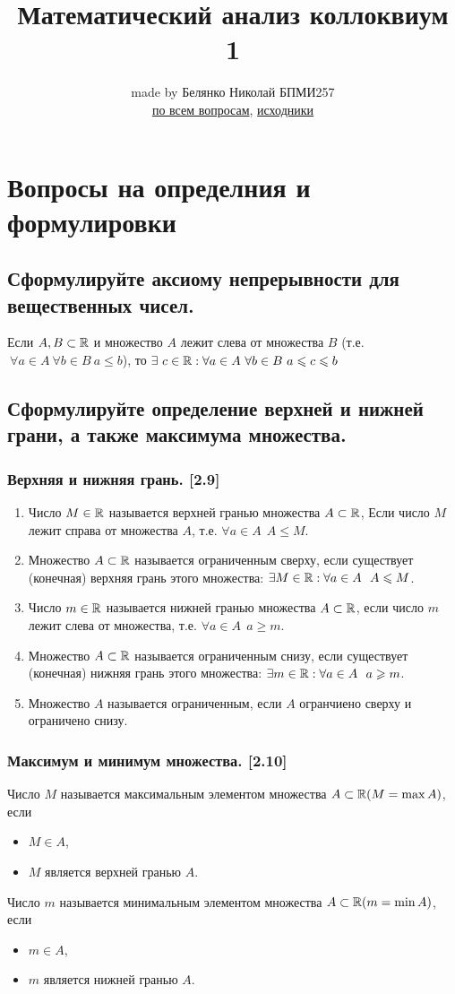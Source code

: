 \documentclass[12pt, a4paper]{article}
\author{made by Белянко Николай БПМИ257 \\
\href{https://t.me/nikbel26}{по всем вопросам}, \href{https://github.com/LoDThe/hse-tex}{исходники}}
\title{Математический анализ коллоквиум 1}
\begin{document}
    \maketitle
    \tableofcontents
    \newpage
    \section{Вопросы на определния и формулировки}
    \subsection{Сформулируйте аксиому непрерывности для вещественных чисел.}
        Если $A, B \subset \mathbb{R}$ и множество $A$ лежит слева от множества $B$ (т.е. $\ \forall a \in A \ \forall b \in B \ a \leq b$), то $\exists \ c \in \RR : \forall a \in A \ \forall b \in B \ a \leq c \leq b$
    \subsection{Сформулируйте определение верхней и нижней грани, а также максимума множества.}
    \subsubsection{Верхняя и нижняя грань. [2.9]}
    \begin{enumerate}
        \item Число $M \in \mathbb{R}$ называется верхней гранью множества $A \subset \mathbb{R}$, Если число $M$ лежит справа от множества $A$, т.е. $\forall a \in A \ \ A \leq M$.
        \item Множество $A \subset \mathbb{R}$ называется ограниченным сверху, если существует (конечная) верхняя грань этого множества: $\exists M \in \mathbb{R} : \forall a \in A \ \ A \leqslant M$.
        \item Число $m \in \mathbb{R}$ называется нижней гранью множества $A \subset \mathbb{R}$, если число $m$ лежит слева от множества, т.е. $\forall a \in A \ \ a \geq m$.
        \item Множество $A \subset \mathbb{R}$ называется ограниченным снизу, если существует (конечная) нижняя грань этого множества: $\exists m \in \mathbb{R} : \forall a \in A \ \ a \geqslant m$.
        \item Множество $A$ называется ограниченным, если $A$ огранчиено сверху и ограничено снизу.
    \end{enumerate}
    \subsubsection{Максимум и минимум множества. [2.10]}
    Число $M$ называется максимальным элементом множества $A \subset \mathbb{R} (M = \max A)$, если
    \begin{itemize}
        \item $M \in A$,
        \item $M$ является верхней гранью $A$.
    \end{itemize}
    Число $m$ называется минимальным элементом множества $A \subset \mathbb{R} (m = \min A)$, если
    \begin{itemize}
        \item $m \in A$,
        \item $m$ является нижней гранью $A$.
    \end{itemize}
\end{document}
